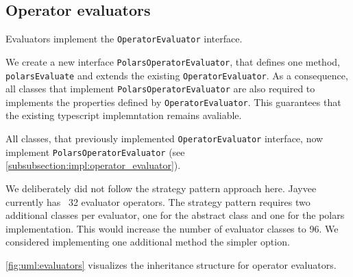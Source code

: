 \subsection{Operator evaluators}
\label{subsection:arch:operator_evaluators}
Evaluators implement the \Verb|OperatorEvaluator| interface.

We create a new interface \Verb|PolarsOperatorEvaluator|, that defines one method, \Verb|polarsEvaluate| and extends the existing \Verb|OperatorEvaluator|.
As a consequence, all classes that implement \Verb|PolarsOperatorEvaluator| are also required to implements the properties defined by \Verb|OperatorEvaluator|.
This guarantees that the existing typescript implemntation remains avaliable.

All classes, that previously implemented \Verb|OperatorEvaluator| interface, now implement \Verb|PolarsOperatorEvaluator| (see \ref{subsubsection:impl:operator_evaluator}).

We deliberately did not follow the strategy pattern approach here.
Jayvee currently has ~32 evaluator operators. %
The strategy pattern requires two additional classes per evaluator, one for the abstract class and one for the polars implementation.
This would increase the number of evaluator classes to 96.
We considered implementing one additional method the simpler option.

\ref{fig:uml:evaluators} visualizes the inheritance structure for operator evaluators.

